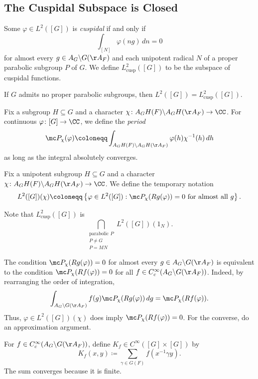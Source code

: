 \documentclass{article}
\begin{document}
\subsection{The Cuspidal Subspace is Closed}
\begin{definition}
	Some $\varphi\in L^2([G])$ is \textit{cuspidal} if and only if
	\[\int_{[N]}\varphi(ng)\,dn=0\]
	for almost every $g\in A_G\backslash G(\AA_F)$ and each unipotent radical $N$ of a proper parabolic subgroup $P$ of $G$. We define $L^2_{\mathrm{cusp}}([G])$ to be the subspace of cuspidal functions.
\end{definition}
\begin{example}
	If $G$ admits no proper parabolic subgroups, then $L^2([G])=L^2_{\mathrm{cusp}}([G])$.
\end{example}
\begin{definition}
	Fix a subgroup $H\subseteq G$ and a character $\chi\colon A_GH(F)\backslash A_GH(\AA_F)\to\CC$. For continuous $\varphi\colon[G]\to\CC$, we define the \textit{period}
	\[\mc P_\chi(\varphi)\coloneqq\int_{A_GH(F)\backslash A_GH(\AA_F)}\varphi(h)\chi^{-1}(h)\,dh\]
	as long as the integral absolutely converges.
\end{definition}
\begin{notation}
	Fix a unipotent subgroup $H\subseteq G$ and a character $\chi\colon A_GH(F)\backslash A_GH(\AA_F)\to\CC$. We define the temporary notation
	\[L^2([G])(\chi)\coloneqq\left\{\varphi\in L^2([G]):\mc P_\chi(Rg(\varphi))=0\text{ for almost all }g\right\}.\]
\end{notation}
\begin{example}
	Note that $L^2_{\mathrm{cusp}}([G])$ is
	\[\bigcap_{\substack{\text{parabolic }P\\P\ne G\\P=MN}}L^2([G])(1_N).\]
\end{example}
\begin{remark}
	The condition $\mc P_\chi(Rg(\varphi))=0$ for almost every $g\in A_G\backslash G(\AA_F)$ is equivalent to the condition $\mc P_\chi(Rf(\varphi))=0$ for all $f\in C_c^\infty(A_G\backslash G(\AA_F))$. Indeed, by rearranging the order of integration,
	\[\int_{A_G\backslash G(\AA_F)}f(g)\mc P_\chi(Rg(\varphi))\,dg=\mc P_\chi(Rf(\varphi)).\]
	Thus, $\varphi\in L^2([G])(\chi)$ does imply $\mc P_\chi(Rf(\varphi))=0$. For the converse, do an approximation argument.
\end{remark}
\begin{definition}
	For $f\in C_c^\infty(A_G\backslash G(\AA_F))$, define $K_f\in C^\infty([G]\times[G])$ by
	\[K_f(x,y)\coloneqq\sum_{\gamma\in G(F)}f\left(x^{-1}\gamma y\right).\]
	The sum converges because it is finite.
\end{definition}
\end{document}
